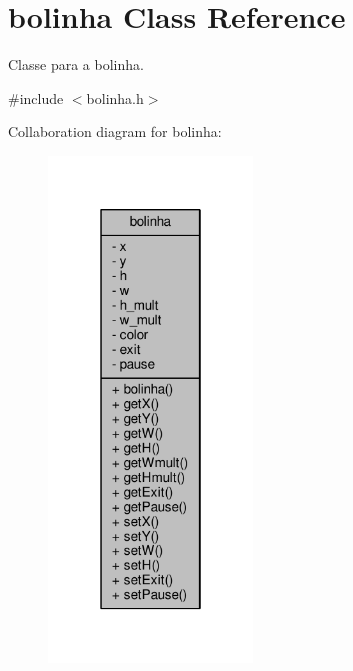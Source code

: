 \hypertarget{classbolinha}{}\section{bolinha Class Reference}
\label{classbolinha}


Classe para a bolinha.  




{\ttfamily \#include $<$bolinha.\+h$>$}



Collaboration diagram for bolinha\+:
\nopagebreak
\begin{figure}[H]
\begin{center}
\leavevmode
\includegraphics[width=154pt]{classbolinha__coll__graph}
\end{center}
\end{figure}

